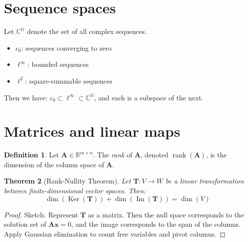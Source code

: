 \documentclass[11pt]{article}
\newcommand{\R}{\mathbb{R}}
\newcommand{\C}{\mathbb{C}}
\newcommand{\N}{\mathbb{N}}
\newcommand{\vect}[1]{\bm{#1}}
\newcommand{\mat}[1]{\bm{#1}}
\DeclareMathOperator{\Ker}{Ker}
\DeclareMathOperator{\Img}{Im}
\DeclareMathOperator{\rank}{rank}
\theoremstyle{definition}
\newtheorem{definition}{Definition}[section]
\theoremstyle{plain}
\newtheorem{theorem}[definition]{Theorem}
\theoremstyle{remark}
\begin{document}
\section{Sequence spaces}

Let \( \C^\N \) denote the set of all complex sequences.

\begin{itemize}
    \item \( c_0 \): sequences converging to zero
    \item \( \ell^\infty \): bounded sequences
    \item \( \ell^2 \): square-summable sequences
\end{itemize}

Then we have: \( c_0 \subset \ell^\infty \subset \C^\N \), and each is a subspace of the next.


\section{Matrices and linear maps}

\begin{definition}
    Let \( \mat{A} \in \R^{m \times n} \). The \emph{rank} of \( \mat{A} \), denoted \( \rank(\mat{A}) \), is the
    dimension of the column space of \( \mat{A} \).
\end{definition}

\begin{theorem}[Rank-Nullity Theorem]
    Let \( \mat{T}: V \to W \) be a linear transformation between finite-dimensional vector spaces. Then:
    \[
        \dim(\Ker(\mat{T})) + \dim(\Img(\mat{T})) = \dim(V)
    \]
\end{theorem}

\begin{proof}
    Sketch: Represent \( \mat{T} \) as a matrix. Then the null space corresponds to the solution set of \(
    \mat{A}\vect{x} = 0 \), and the image corresponds to the span of the columns. Apply Gaussian elimination to count
    free variables and pivot columns.
\end{proof}
\end{document}
